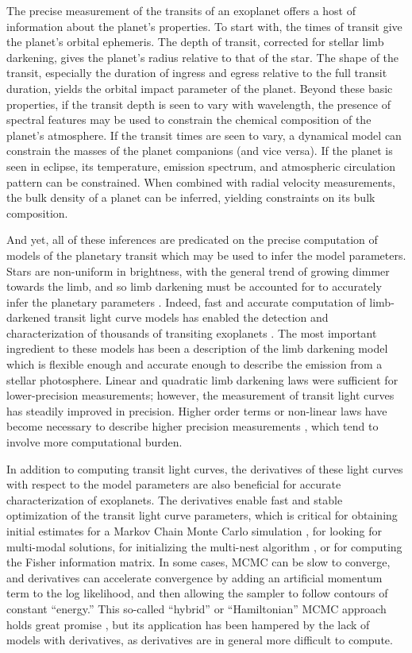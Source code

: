 \documentclass[modern]{aastex61}
\begin{document}
The precise measurement of the transits of an exoplanet offers a host of information
about the planet's properties.  To start with, the times of transit give
the planet's orbital ephemeris.  The depth of transit, corrected for stellar
limb darkening, gives the planet's radius relative to that of the star.   The
shape of the transit, especially the duration of ingress and egress relative to
the full transit duration, yields the orbital impact parameter of the planet.
Beyond these basic properties, if the transit depth is seen to vary with wavelength,
the presence of spectral features may be used to constrain the chemical composition
of the planet's atmosphere.  If the transit times are seen to vary, a dynamical
model can constrain the masses of the planet companions (and vice versa).  If
the planet is seen in eclipse, its temperature, emission spectrum, and atmospheric
circulation pattern can be constrained.  When combined with radial velocity
measurements, the bulk density of a planet can be inferred, yielding constraints
on its bulk composition.

And yet, all of these inferences are predicated on the precise computation of models
of the planetary transit which may be used to infer the model parameters.  Stars
are non-uniform in brightness, with the general
trend of growing dimmer towards the limb, and so limb darkening must be accounted
for to accurately infer the planetary parameters \citep{Csizmadia2018}.  Indeed, fast
and accurate computation of limb-darkened transit light curve models has enabled the
detection and characterization of thousands of transiting exoplanets \citep{MandelAgol2002}.
The most important ingredient to these models has been a description of the
limb darkening model which is flexible enough and accurate enough to describe the
emission from a stellar photosphere.  Linear and quadratic limb darkening laws
were sufficient for lower-precision measurements; however, the measurement of
transit light curves has steadily improved in precision.  Higher order terms or non-linear laws
have become necessary to describe higher precision measurements \citep{Kopal1950,Claret2000,
Gimenez2006}, which tend to involve more computational burden.

In addition to computing transit light curves, the derivatives of these light
curves with respect to the model parameters are also beneficial for accurate
characterization of exoplanets.   The derivatives enable fast and stable
optimization of the transit light curve parameters, which is critical for
obtaining initial estimates for a Markov Chain Monte Carlo simulation
\citep[MCMC; e.g.][]{Ford2005,Ford2006},
for looking for multi-modal solutions, for initializing the multi-nest
algorithm \citep{Feroz2008}, or for computing the Fisher information matrix.
In some cases, MCMC can be slow to converge, and derivatives can accelerate
convergence by adding an artificial momentum term to the log likelihood,
and then allowing the sampler to follow contours of constant ``energy.''
This so-called ``hybrid'' or ``Hamiltonian'' MCMC approach holds great promise \citep{Neal2011,Girolami2011,Betancourt2017},
but its application has been hampered by the lack of models with derivatives,
as derivatives are in general more difficult to compute.
\end{document}
